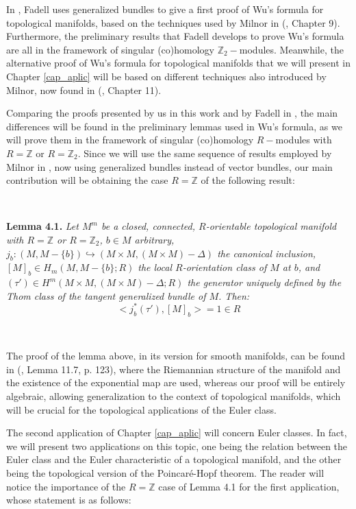 \documentclass[12pt,oneside]{book}
\newcommand{\Z}{\mathbb{Z}}
\begin{document}
    In \cite{fadell_1}, Fadell uses generalized bundles to give a first proof of Wu's formula for 
    topological manifolds, based on the techniques used by Milnor in (\cite{milnor_2}, Chapter 9). 
    Furthermore, the preliminary results that Fadell develops to prove Wu's formula are all in the 
    framework of singular (co)homology $\Z_{2}-$modules. Meanwhile, the alternative proof of Wu's 
    formula for topological manifolds that we will present in Chapter \ref{cap_aplic} will be based on 
    different techniques also introduced by Milnor, now found in (\cite{milnor_1}, Chapter 11).

    Comparing the proofs presented by us in this work and by Fadell in \cite{fadell_1}, the main 
    differences will be found in the preliminary lemmas used in Wu's formula, as we will prove them in 
    the framework of singular (co)homology $R-$modules with $R=\Z$ or $R=\Z_{2}$. Since we will use the 
    same sequence of results employed by Milnor in \cite{milnor_1}, now using generalized bundles 
    instead of vector bundles, our main contribution will be obtaining the case $R=\Z$ of the following 
    result:

    \

        \textbf{Lemma 4.1.} \textit{Let $M^{m}$ be a closed, connected, $R$-orientable topological manifold 
        with $R=\Z$ or $R=\Z_{2}$, $b\in M$ arbitrary, 
        $j_{b}:(M,M-\{b\})\hookrightarrow (M\times M,(M\times M)-\Delta)$ the canonical inclusion, 
        $[M]_{b}\in H_{m}(M,M-\{b\};R)$ the local $R$-orientation class of $M$ at $b$, and 
        $(\tau')\in H^{m}(M\times M,(M\times M)-\Delta;R)$ the generator uniquely defined by the Thom class 
        of the tangent generalized bundle of $M$. Then:
            $$ <j_{b}^{*}(\tau'),[M]_{b}>=1\in R $$}
    
    \

    The proof of the lemma above, in its version for smooth manifolds, can be found in (\cite{milnor_1}, 
    Lemma 11.7, p. 123), where the Riemannian structure of the manifold and the existence of the 
    exponential map are used, whereas our proof will be entirely algebraic, allowing generalization to 
    the context of topological manifolds, which will be crucial for the topological applications of the 
    Euler class.

    The second application of Chapter \ref{cap_aplic} will concern Euler classes. In fact, we will 
    present two applications on this topic, one being the relation between the Euler class and the Euler 
    characteristic of a topological manifold, and the other being the topological version of the 
    Poincaré-Hopf theorem. The reader will notice the importance of the $R=\Z$ case of Lemma 4.1 for the 
    first application, whose statement is as follows:
\end{document}
